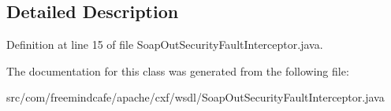 \subsection{Detailed Description}


Definition at line 15 of file Soap\+Out\+Security\+Fault\+Interceptor.\+java.



The documentation for this class was generated from the following file\+:\begin{DoxyCompactItemize}
\item 
src/com/freemindcafe/apache/cxf/wsdl/Soap\+Out\+Security\+Fault\+Interceptor.\+java\end{DoxyCompactItemize}
